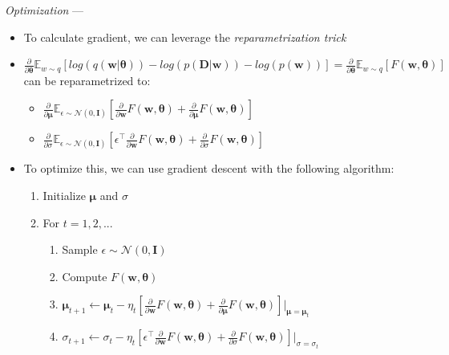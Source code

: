 \emph{Optimization} ---
\begin{itemize}
    \item To calculate gradient, we can leverage the \emph{reparametrization trick}
    \item $\frac{\partial}{\partial \boldsymbol{\theta}} \mathbb{E}_{w \sim q} [ log( q(\boldsymbol{w}|\boldsymbol{\theta}) ) - log (p(\boldsymbol{D}|\boldsymbol{w})) - log (p(\boldsymbol{w})) ] = \frac{\partial}{\partial \boldsymbol{\theta}} \mathbb{E}_{w \sim q} [ F(\boldsymbol{w}, \boldsymbol{\theta}) ]$ can be reparametrized to:
    \begin{itemize}
        \item $\frac{\partial}{\partial \boldsymbol{\mu}} \mathbb{E}_{\epsilon \sim \mathcal{N}(0,\boldsymbol{I})} [ \frac{\partial}{\partial \boldsymbol{w}} F(\boldsymbol{w}, \boldsymbol{\theta}) + \frac{\partial}{\partial \boldsymbol{\mu}} F(\boldsymbol{w}, \boldsymbol{\theta}) ]$
        \item $\frac{\partial}{\partial \sigma} \mathbb{E}_{\epsilon \sim \mathcal{N}(0,\boldsymbol{I})} [ \epsilon^\intercal \frac{\partial}{\partial \boldsymbol{w}} F(\boldsymbol{w}, \boldsymbol{\theta}) + \frac{\partial}{\partial \sigma} F(\boldsymbol{w}, \boldsymbol{\theta}) ]$
    \end{itemize}
    \item To optimize this, we can use gradient descent with the following algorithm:
    \begin{enumerate}
        \item Initialize $\boldsymbol{\mu}$ and $\sigma$
        \item For $t = 1, 2, ...$
        \begin{enumerate}
            \item Sample $\epsilon \sim \mathcal{N}(0,\boldsymbol{I})$
            \item Compute $F(\boldsymbol{w}, \boldsymbol{\theta})$
            \item $\boldsymbol{\mu}_{t+1} \leftarrow \boldsymbol{\mu}_t - \eta_t [ \frac{\partial}{\partial \boldsymbol{w}} F(\boldsymbol{w}, \boldsymbol{\theta}) + \frac{\partial}{\partial \boldsymbol{\mu}} F(\boldsymbol{w}, \boldsymbol{\theta}) ] |_{\boldsymbol{\mu} = \boldsymbol{\mu}_t}$\\
            \item $\sigma_{t+1} \leftarrow \sigma_t - \eta_t [ \epsilon^\intercal \frac{\partial}{\partial \boldsymbol{w}} F(\boldsymbol{w}, \boldsymbol{\theta}) + \frac{\partial}{\partial \sigma} F(\boldsymbol{w}, \boldsymbol{\theta}) ] |_{\sigma = \sigma_t}$
        \end{enumerate}
    \end{enumerate}
\end{itemize}
